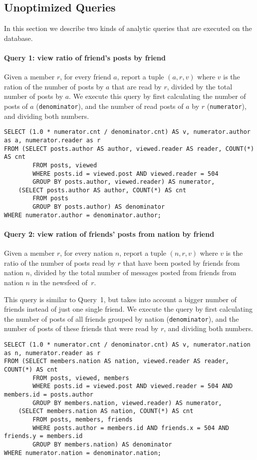 \documentclass[12pt]{article}
\begin{document}
\subsection{Unoptimized Queries}
In this section we describe two kinds of analytic queries that are executed on the database.

\paragraph{Query 1: view ratio of friend's posts by friend}
Given a member $r$, for every friend $a$, report a tuple $(a,r,v)$ where $v$ is the ration of the number of posts by $a$ that are read by $r$, divided by the total number of posts by $a$. We execute this query by first calculating the number of posts of $a$ (\lstinline{denominator}), and the number of read posts of $a$ by $r$ (\lstinline{numerator}), and dividing both numbers.

\begin{lstlisting}
SELECT (1.0 * numerator.cnt / denominator.cnt) AS v, numerator.author as a, numerator.reader as r
FROM (SELECT posts.author AS author, viewed.reader AS reader, COUNT(*) AS cnt
		FROM posts, viewed
		WHERE posts.id = viewed.post AND viewed.reader = 504
		GROUP BY posts.author, viewed.reader) AS numerator,
	(SELECT posts.author AS author, COUNT(*) AS cnt
		FROM posts
		GROUP BY posts.author) AS denominator
WHERE numerator.author = denominator.author;
\end{lstlisting}
\vspace{-0.25cm}
\paragraph{Query 2: view ration of friends' posts from nation by friend} Given a member $r$, for every nation $n$, report a tuple $(n,r,v)$ where $v$ is the ratio of the number of posts read by $r$ that have been posted by friends from nation $n$, divided by the total number of messages posted from friends from nation $n$ in the newsfeed of~$r$.

This query is similar to Query~1, but takes into account a bigger number of friends instead of just one single friend. We execute the query by first calculating the number of posts of all friends grouped by nation (\lstinline{denominator}), and the number of posts of these friends that were read by $r$, and dividing both numbers.

\begin{lstlisting}
SELECT (1.0 * numerator.cnt / denominator.cnt) AS v, numerator.nation as n, numerator.reader as r
FROM (SELECT members.nation AS nation, viewed.reader AS reader, COUNT(*) AS cnt
		FROM posts, viewed, members
		WHERE posts.id = viewed.post AND viewed.reader = 504 AND members.id = posts.author
		GROUP BY members.nation, viewed.reader) AS numerator,
	(SELECT members.nation AS nation, COUNT(*) AS cnt
		FROM posts, members, friends
		WHERE posts.author = members.id AND friends.x = 504 AND friends.y = members.id
		GROUP BY members.nation) AS denominator
WHERE numerator.nation = denominator.nation;
\end{lstlisting}
\end{document}
